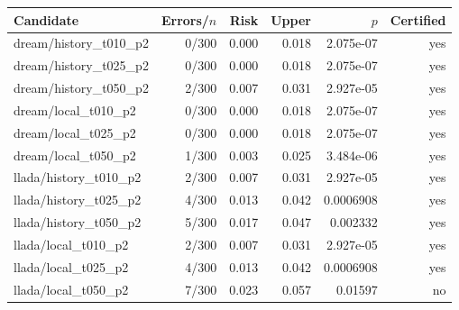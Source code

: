 \begin{tabular}{lrrrrr}
\toprule
Candidate & Errors/$n$ & Risk & Upper & $p$ & Certified \\
\midrule
dream/history\_t010\_p2 & 0/300 & 0.000 & 0.018 & 2.075e-07 & yes \\
dream/history\_t025\_p2 & 0/300 & 0.000 & 0.018 & 2.075e-07 & yes \\
dream/history\_t050\_p2 & 2/300 & 0.007 & 0.031 & 2.927e-05 & yes \\
dream/local\_t010\_p2 & 0/300 & 0.000 & 0.018 & 2.075e-07 & yes \\
dream/local\_t025\_p2 & 0/300 & 0.000 & 0.018 & 2.075e-07 & yes \\
dream/local\_t050\_p2 & 1/300 & 0.003 & 0.025 & 3.484e-06 & yes \\
llada/history\_t010\_p2 & 2/300 & 0.007 & 0.031 & 2.927e-05 & yes \\
llada/history\_t025\_p2 & 4/300 & 0.013 & 0.042 & 0.0006908 & yes \\
llada/history\_t050\_p2 & 5/300 & 0.017 & 0.047 & 0.002332 & yes \\
llada/local\_t010\_p2 & 2/300 & 0.007 & 0.031 & 2.927e-05 & yes \\
llada/local\_t025\_p2 & 4/300 & 0.013 & 0.042 & 0.0006908 & yes \\
llada/local\_t050\_p2 & 7/300 & 0.023 & 0.057 & 0.01597 & no \\
\bottomrule
\end{tabular}
